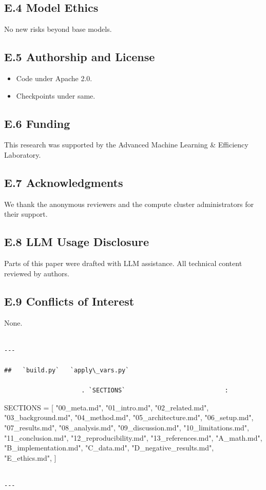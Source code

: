 \subsection{E.4 Model Ethics}

No new risks beyond base models.

\subsection{E.5 Authorship and License}

\begin{itemize}
\item Code under Apache 2.0.
\item Checkpoints under same.

\end{itemize}
\subsection{E.6 Funding}

This research was supported by the Advanced Machine Learning \& Efficiency Laboratory.

\subsection{E.7 Acknowledgments}

We thank the anonymous reviewers and the compute cluster administrators for their support.

\subsection{E.8 LLM Usage Disclosure}

Parts of this paper were drafted with LLM assistance. All technical content 
reviewed by authors.

\subsection{E.9 Conflicts of Interest}

None.
\begin{lstlisting}

---

##   `build.py`   `apply\_vars.py`

                     . `SECTIONS`                           :

\end{lstlisting}
SECTIONS = [
    "00\_meta.md", "01\_intro.md", "02\_related.md", "03\_background.md",
    "04\_method.md", "05\_architecture.md", "06\_setup.md", "07\_results.md",
    "08\_analysis.md", "09\_discussion.md", "10\_limitations.md",
    "11\_conclusion.md", "12\_reproducibility.md", "13\_references.md",
    "A\_math.md", "B\_implementation.md", "C\_data.md",
    "D\_negative\_results.md", "E\_ethics.md",
]
\begin{lstlisting}

---
\end{lstlisting}